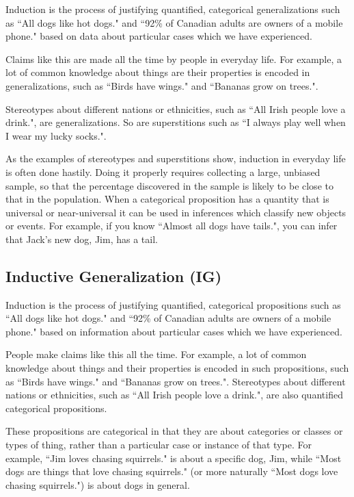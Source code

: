 
Induction is the process of justifying quantified, categorical generalizations such as ``All dogs like hot dogs." and ``92\% 
of Canadian adults 
are owners of a mobile phone." based on data about particular cases which we have experienced.

Claims like this are made all the time by people in everyday life. For example, a lot of common knowledge about things are their properties 
is encoded in generalizations, such as ``Birds have wings." and ``Bananas grow on trees.".

Stereotypes about different nations or ethnicities, such as ``All Irish people love a drink.", are generalizations. So are superstitions such 
as ``I always play well when I wear my lucky socks.".

As the examples of stereotypes and superstitions show, induction in everyday life is often done hastily. Doing it properly requires 
collecting a large, unbiased sample, so that the percentage discovered in the sample is likely to be close to that in the population. When a 
categorical proposition has a quantity that is universal or near-universal it can be used in inferences which classify new objects or 
events. For example, if you know ``Almost all dogs have tails.", you can infer that Jack's new dog, Jim, has a tail.

\subsection{Inductive Generalization (IG)}

Induction is the process of justifying quantified, categorical propositions such as ``All dogs like hot dogs." 
and ``92\% 
of Canadian adults are owners of a mobile phone." based on information about particular cases which we have experienced. 

People make claims like this all the time. For example, a lot of common knowledge about things and their properties is encoded in such 
propositions, such as ``Birds have wings." and ``Bananas grow on trees.". Stereotypes about different nations or ethnicities, such as ``All 
Irish people love a drink.", are also quantified categorical propositions.

These propositions are categorical in that they are about categories or classes or types of thing, rather than a particular case or instance 
of that type. For example, ``Jim loves chasing squirrels." is about a specific dog, Jim, while ``Most dogs are things that love chasing 
squirrels." (or more naturally ``Most dogs love chasing squirrels.") is about dogs in general.

